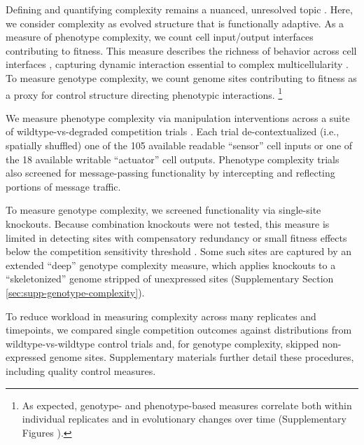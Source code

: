 Defining and quantifying complexity remains a nuanced, unresolved topic \citep{adami2002what,parrott2010measuring,bottcher2017molecules,tenaillon2007quantifying,bonchev2005complexity,hazen2007functional,marion2015extending,rebout2021measuring,McShea1996}.
Here, we consider complexity as evolved structure that is functionally adaptive.
As a measure of phenotype complexity, we count cell input/output interfaces contributing to fitness.
This measure describes the richness of behavior across cell interfaces \citep{mcshea2000functional}, capturing dynamic interaction essential to complex multicellularity \citep{knoll2011multiple,niklas2013origins,brunet2017origin,bonner2001first}.
To measure genotype complexity, we count genome sites contributing to fitness \citep{dolson2019modes,adami2000evolution} as a proxy for control structure directing phenotypic interactions.
\unskip\footnote{%
As expected, genotype- and phenotype-based measures correlate both within individual replicates and in evolutionary changes over time (Supplementary Figures ).
}

We measure phenotype complexity via manipulation interventions across a suite of wildtype-vs-degraded competition trials \citep{sinervo1996testing}.
Each trial de-contextualized (i.e., spatially shuffled) one of the 105 available readable ``sensor'' cell inputs or one of the 18 available writable ``actuator'' cell outputs.
Phenotype complexity trials also screened for message-passing functionality by intercepting and reflecting portions of message traffic.

To measure genotype complexity, we screened functionality via single-site knockouts.
Because combination knockouts were not tested, this measure is limited in detecting sites with compensatory redundancy or small fitness effects below the competition sensitivity threshold \citep{moreno2024methods}.
Some such sites are captured by an extended ``deep'' genotype complexity measure, which applies knockouts to a ``skeletonized'' genome stripped of unexpressed sites (Supplementary Section \ref{sec:supp-genotype-complexity}).

To reduce workload in measuring complexity across many replicates and timepoints, we compared single competition outcomes against distributions from wildtype-vs-wildtype control trials and, for genotype complexity, skipped non-expressed genome sites.
Supplementary materials further detail these procedures, including quality control measures.

